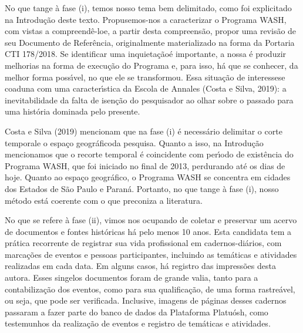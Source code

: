 \documentclass[
12pt,		%
openright,	%
twoside,  %
a4paper,			%
chapter=TITLE,		%
english,			%
french,				%
spanish,			%
brazil				%
]{USPSC-classe/USPSC}
\begin{document}
No que tange \`a fase (i), temos nosso tema bem delimitado, como foi explicitado na Introdu\c{c}\~ao deste texto. Propusemos-nos a caracterizar o Programa WASH, com vistas a \textquotedbl compreend\^e-lo\textquotedbl  e, a partir desta compreens\~ao, propor uma revis\~ao de seu Documento de Refer\^encia, originalmente materializado na forma da Portaria CTI 178/2018. Se \textquotedbl identificar uma inquieta\c{c}\~ao\textquotedbl  \'e importante, a nossa \'e produzir melhorias na forma de execu\c{c}\~ao do Programa e, para isso, h\'a que se conhecer, da melhor forma poss\'{\i}vel, no que ele se transformou. Essa situa\c{c}\~ao de \textquotedbl interesse\textquotedbl  se coaduna com uma caracter\'{\i}stica da Escola de Annales  (Costa e Silva, 2019): \textquotedbl a inevitabilidade da falta de isen\c{c}\~ao do pesquisador ao olhar sobre o passado para uma hist\'oria dominada pelo presente.\textquotedbl 








Costa e Silva (2019) mencionam que na fase (i) \'e necess\'ario delimitar o \textquotedbl corte temporal\textquotedbl  e o \textquotedbl espa\c{c}o geogr\'afico\textquotedbl  da pesquisa.  Quanto a isso, na Introdu\c{c}\~ao mencionamos que o recorte temporal \'e coincidente com per\'{\i}odo de exist\^encia do Programa WASH, que foi iniciado no final de 2013, perdurando at\'e os dias de hoje. Quanto ao espa\c{c}o geogr\'afico, o Programa WASH se concentra em cidades dos Estados de S\~ao Paulo e Paran\'a. Portanto, no que tange \`a fase (i), nosso m\'etodo est\'a coerente com o que preconiza a literatura.








No que se refere \`a fase (ii), vimos nos ocupando de coletar e preservar um acervo de documentos e fontes hist\'oricas h\'a pelo menos 10 anos. Esta candidata tem a pr\'atica recorrente de registrar sua vida profissional em cadernos-di\'arios, com marca\c{c}\~oes de eventos e pessoas participantes, incluindo as tem\'aticas e atividades realizadas em cada data. Em alguns casos, h\'a registro das impress\~oes desta autora. Esses singelos documentos foram de grande valia, tanto para a contabiliza\c{c}\~ao dos eventos, como para sua qualifica\c{c}\~ao, de uma forma rastre\'avel, ou seja, que pode ser verificada. Inclusive, imagens de p\'aginas desses cadernos passaram a fazer parte do banco de dados da Plataforma Platu\'osh, como testemunhos da realiza\c{c}\~ao de eventos e registro de tem\'aticas e atividades.
\end{document}
